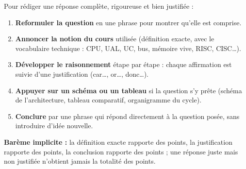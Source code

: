 \documentclass[11pt]{article}
\begin{document}
\begin{methode}
Pour rédiger une réponse complète, rigoureuse et bien justifiée :
\begin{enumerate}
\item \textbf{Reformuler la question} en une phrase pour montrer qu'elle est comprise.
\item \textbf{Annoncer la notion du cours} utilisée (définition exacte, avec le vocabulaire technique : CPU, UAL, UC, bus, mémoire vive, RISC, CISC\ldots).
\item \textbf{Développer le raisonnement} étape par étape : chaque affirmation est suivie d'une justification (\og car\ldots \fg{}, \og or\ldots \fg{}, \og donc\ldots \fg{}).
\item \textbf{Appuyer sur un schéma ou un tableau} si la question s'y prête (schéma de l'architecture, tableau comparatif, organigramme du cycle).
\item \textbf{Conclure} par une phrase qui répond directement à la question posée, sans introduire d'idée nouvelle.
\end{enumerate}
\textbf{Barème implicite :} la définition exacte rapporte des points, la justification rapporte des points, la conclusion rapporte des points ; une réponse juste mais non justifiée n'obtient jamais la totalité des points.
\end{methode}
\end{document}
